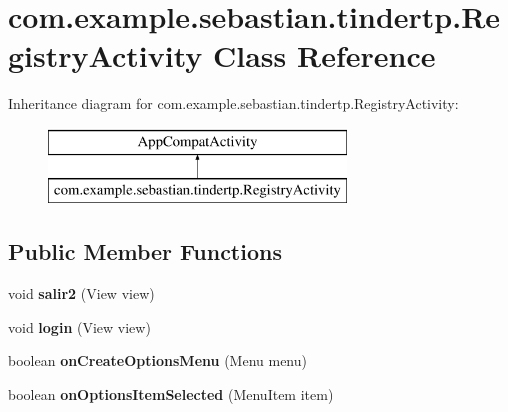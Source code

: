 \hypertarget{classcom_1_1example_1_1sebastian_1_1tindertp_1_1RegistryActivity}{}\section{com.\+example.\+sebastian.\+tindertp.\+Registry\+Activity Class Reference}
\label{classcom_1_1example_1_1sebastian_1_1tindertp_1_1RegistryActivity}
Inheritance diagram for com.\+example.\+sebastian.\+tindertp.\+Registry\+Activity\+:\begin{figure}[H]
\begin{center}
\leavevmode
\includegraphics[height=2.000000cm]{classcom_1_1example_1_1sebastian_1_1tindertp_1_1RegistryActivity}
\end{center}
\end{figure}
\subsection*{Public Member Functions}
\begin{DoxyCompactItemize}
\item 
void {\bfseries salir2} (View view)\hypertarget{classcom_1_1example_1_1sebastian_1_1tindertp_1_1RegistryActivity_ab14da5456c8d71fdbbb9c65fd33a4f85}{}\label{classcom_1_1example_1_1sebastian_1_1tindertp_1_1RegistryActivity_ab14da5456c8d71fdbbb9c65fd33a4f85}

\item 
void {\bfseries login} (View view)\hypertarget{classcom_1_1example_1_1sebastian_1_1tindertp_1_1RegistryActivity_a0c4772e0e6149e1fd9e76c11c9131225}{}\label{classcom_1_1example_1_1sebastian_1_1tindertp_1_1RegistryActivity_a0c4772e0e6149e1fd9e76c11c9131225}

\item 
boolean {\bfseries on\+Create\+Options\+Menu} (Menu menu)\hypertarget{classcom_1_1example_1_1sebastian_1_1tindertp_1_1RegistryActivity_a5366ab0d988d6382e5edb9de82ef456a}{}\label{classcom_1_1example_1_1sebastian_1_1tindertp_1_1RegistryActivity_a5366ab0d988d6382e5edb9de82ef456a}

\item 
boolean {\bfseries on\+Options\+Item\+Selected} (Menu\+Item item)\hypertarget{classcom_1_1example_1_1sebastian_1_1tindertp_1_1RegistryActivity_a909c6c3d689e7f07d409ab0dad1b7614}{}\label{classcom_1_1example_1_1sebastian_1_1tindertp_1_1RegistryActivity_a909c6c3d689e7f07d409ab0dad1b7614}

\end{DoxyCompactItemize}
